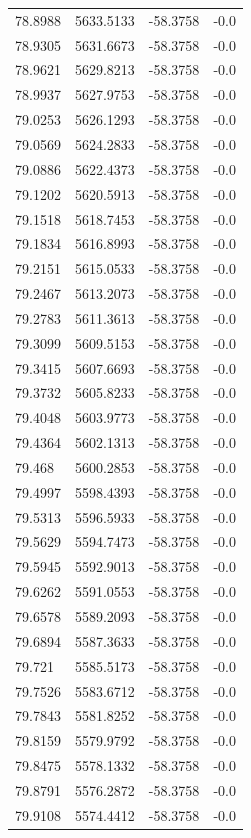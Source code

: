 \begin{table}[H]
\begin{tabular}{llll}
78.8988 & 5633.5133 & -58.3758 & -0.0 \\
78.9305 & 5631.6673 & -58.3758 & -0.0 \\
78.9621 & 5629.8213 & -58.3758 & -0.0 \\
78.9937 & 5627.9753 & -58.3758 & -0.0 \\
79.0253 & 5626.1293 & -58.3758 & -0.0 \\
79.0569 & 5624.2833 & -58.3758 & -0.0 \\
79.0886 & 5622.4373 & -58.3758 & -0.0 \\
79.1202 & 5620.5913 & -58.3758 & -0.0 \\
79.1518 & 5618.7453 & -58.3758 & -0.0 \\
79.1834 & 5616.8993 & -58.3758 & -0.0 \\
79.2151 & 5615.0533 & -58.3758 & -0.0 \\
79.2467 & 5613.2073 & -58.3758 & -0.0 \\
79.2783 & 5611.3613 & -58.3758 & -0.0 \\
79.3099 & 5609.5153 & -58.3758 & -0.0 \\
79.3415 & 5607.6693 & -58.3758 & -0.0 \\
79.3732 & 5605.8233 & -58.3758 & -0.0 \\
79.4048 & 5603.9773 & -58.3758 & -0.0 \\
79.4364 & 5602.1313 & -58.3758 & -0.0 \\
79.468 & 5600.2853 & -58.3758 & -0.0 \\
79.4997 & 5598.4393 & -58.3758 & -0.0 \\
79.5313 & 5596.5933 & -58.3758 & -0.0 \\
79.5629 & 5594.7473 & -58.3758 & -0.0 \\
79.5945 & 5592.9013 & -58.3758 & -0.0 \\
79.6262 & 5591.0553 & -58.3758 & -0.0 \\
79.6578 & 5589.2093 & -58.3758 & -0.0 \\
79.6894 & 5587.3633 & -58.3758 & -0.0 \\
79.721 & 5585.5173 & -58.3758 & -0.0 \\
79.7526 & 5583.6712 & -58.3758 & -0.0 \\
79.7843 & 5581.8252 & -58.3758 & -0.0 \\
79.8159 & 5579.9792 & -58.3758 & -0.0 \\
79.8475 & 5578.1332 & -58.3758 & -0.0 \\
79.8791 & 5576.2872 & -58.3758 & -0.0 \\
79.9108 & 5574.4412 & -58.3758 & -0.0 \\

\end{tabular}
\end{table}
